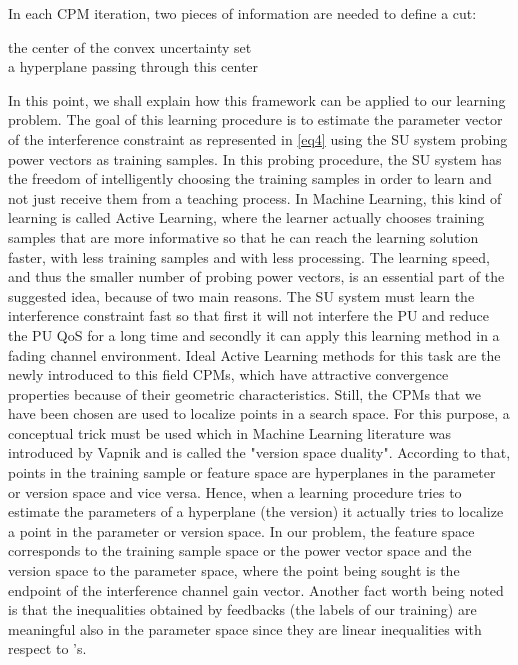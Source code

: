 \documentclass[journal]{IEEEtran}
\begin{document}
In each CPM iteration, two pieces of information are needed to define a cut:

\begin{description}
  \item[]
  \item[ the center of the convex uncertainty set]
  \item[]
  \item[ a hyperplane passing through this center]
  \item[]
\end{description}

In this point, we shall explain how this framework can be applied to our learning problem. The goal of this learning procedure is to estimate the parameter vector  of the interference constraint as represented in \eqref{eq4} using the SU system probing power vectors as training samples. In this probing procedure, the SU system has the freedom of intelligently choosing the training samples in order to learn and not just receive them from a teaching process. In Machine Learning, this kind of learning is called Active Learning, where the learner actually chooses training samples that are more informative so that he can reach the learning solution faster, with less training samples and with less processing. The learning speed, and thus the smaller number of probing power vectors, is an essential part of the suggested idea, because of two main reasons. The SU system must learn the interference constraint fast so that first it will not interfere the PU and reduce the PU QoS for a long time and secondly it can apply this learning method in a fading channel environment. Ideal Active Learning methods for this task are the newly introduced to this field CPMs, which have attractive convergence properties because of their geometric characteristics. Still, the CPMs that we have been chosen are used to localize points in a search space. For this purpose, a conceptual trick must be used which in Machine Learning literature was introduced by Vapnik \cite{biban29} and is called the "version space duality". According to that, points in the training sample or feature space are hyperplanes in the parameter or version space and vice versa. Hence, when a learning procedure tries to estimate the parameters of a hyperplane (the version) it actually tries to localize a point in the parameter or version space. In our problem, the feature space corresponds to the training sample space or the power vector space and the version space to the parameter  space, where the point being sought is the endpoint of the interference channel gain vector. Another fact worth being noted is that the inequalities obtained by feedbacks (the labels of our training) are meaningful also in the parameter  space since they are linear inequalities with respect to 's.
\end{document}
